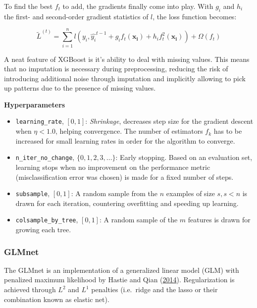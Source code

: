 \documentclass[
  11pt,
  a4paper,
  DIV=12,captions=tableheading,oneside,titlepage=firstiscover,abstracton]{scrreprt}
\providecommand{\tightlist}{%
  \setlength{\itemsep}{0pt}\setlength{\parskip}{0pt}}
\providecommand{\tightlist}{%
  \setlength{\itemsep}{0pt}\setlength{\parskip}{0pt}}
\begin{document}
To find the best \(f_t\) to add, the gradients finally come into play. With \(g_i\) and \(h_i\) the first- and second-order gradient statistics of \(l\), the loss function becomes:

\begin{equation}
\tilde{L}^{(t)} = \sum_{i=1}^n l(y_i, \hat{y_i}^{t-1} + g_if_t(\mathbf{x_i}) + h_i f_t^2(\mathbf{x_i})) +\Omega(f_t)
\label{eq:gbm-grad}
\end{equation}

A neat feature of XGBoost is it's ability to deal with missing values. This means that no imputation is necessary during preprocessing, reducing the risk of introducing additional noise through imputation and implicitly allowing to pick up patterns due to the presence of missing values.

\textbf{Hyperparameters}

\begin{itemize}
\tightlist
\item
  \texttt{learning\_rate}, \([0, 1]\): \emph{Shrinkage}, decreases step size for the gradient descent when \(\eta < 1.0\), helping convergence. The number of estimators \(f_k\) has to be increased for small learning rates in order for the algorithm to converge.
\item
  \texttt{n\_iter\_no\_change}, \(\{0,1,2,3, ...\}\): Early stopping. Based on an evaluation set, learning stops when no improvement on the performance metric (misclassification error was chosen) is made for a fixed number of steps.
\item
  \texttt{subsample}, \([0, 1]\): A random sample from the \(n\) examples of size \(s, s < n\) is drawn for each iteration, countering overfitting and speeding up learning.
\item
  \texttt{colsample\_by\_tree}, \([0, 1]\): A random sample of the \(m\) features is drawn for growing each tree.
\end{itemize}

\hypertarget{glmnet}{%
\subsubsection{GLMnet}\label{glmnet}}

The GLMnet is an implementation of a generalized linear model (GLM) with penalized maximum likelihood by Hastie and Qian (\protect\hyperlink{ref-hastie2014glmnet}{2014}). Regularization is achieved through \(L^2\) and \(L^1\) penalties (i.e.~ridge and the lasso or their combination known as elastic net).
\end{document}
